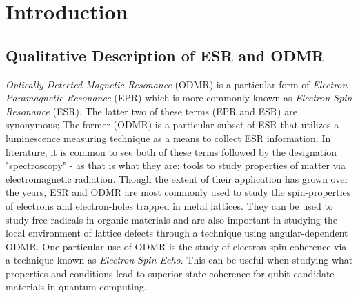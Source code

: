 \documentclass[oneside, astronomy, noacknowlegments]{BYUPhys}
\begin{document}
 \frontmatter

 \makepreliminarypages

 \tableofcontents

 \mainmatter

\listoffigures 


\chapter{Introduction}

\section{Qualitative Description of ESR and ODMR}
\label{sec:Qualitative}

\textit{Optically Detected Magnetic Resonance} (ODMR) is a particular form of \textit{Electron Paramagnetic Resonance} (EPR) which is more commonly known as \textit{Electron Spin Resonance} (ESR). The latter two of these terms (EPR and ESR) are synonymous; The former (ODMR) is a particular subset of ESR that utilizes a luminescence measuring technique as a means to collect ESR information. In literature, it is common to see both of these terms followed by the designation "spectroscopy" - as that is what they are: tools to study properties of matter via electromagnetic radiation. Though the extent of their application has grown over the years, ESR and ODMR are most commonly used to study the spin-properties of electrons and electron-holes trapped in metal lattices. They can be used to study free radicals in organic materials and are also important in studying the local environment of lattice defects through a technique using angular-dependent ODMR. One particular use of ODMR is the study of electron-spin coherence via a technique known as \textit{Electron Spin Echo}. This can be useful when studying what properties and conditions lead to superior state coherence for qubit candidate materials in quantum computing.
\end{document}
